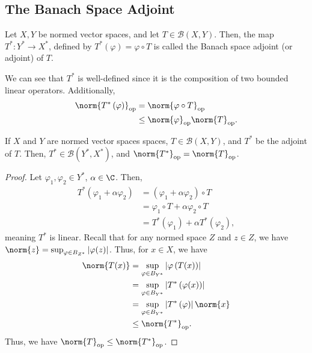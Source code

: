 \documentclass[10pt]{mypackage}
\begin{document}
\subsection{The Banach Space Adjoint}%
\begin{definition}
  Let $X,Y$ be normed vector spaces, and let $T\in \mathcal{B}\left(X,Y\right)$. Then, the map $T^{\ast}:Y^{\ast}\rightarrow X^{\ast}$, defined by $T^{\ast}\left(\varphi\right) = \varphi\circ T$ is called the Banach space adjoint (or adjoint) of $T$.
\end{definition}
We can see that $T^{\ast}$ is well-defined since it is the composition of two bounded linear operators. Additionally,
\begin{align*}
  \norm{T^{\ast}\left(\varphi\right)}_{\text{op}} &= \norm{\varphi\circ T}_{\text{op}}\\
                                                  &\leq \norm{\varphi}_{\text{op}}\norm{T}_{\text{op}}.
\end{align*}
\begin{proposition}
  If $X$ and $Y$ are normed vector spaces spaces, $T\in \mathcal{B}\left(X,Y\right)$, and $T^{\ast}$ be the adjoint of $T$. Then, $T^{\ast}\in \mathcal{B}\left(Y^{\ast},X^{\ast}\right)$, and $\norm{T^{\ast}}_{\text{op}} = \norm{T}_{\text{op}}$.
\end{proposition}
\begin{proof}
  Let $\varphi_1,\varphi_2\in Y^{\ast}$, $\alpha \in \C$. Then,
  \begin{align*}
    T^{\ast}\left(\varphi_1 + \alpha\varphi_2\right) &= \left(\varphi_1 + \alpha\varphi_2\right)\circ T\\
                                                     &= \varphi_1\circ T + \alpha\varphi_2\circ T\\
                                                     &= T^{\ast}\left(\varphi_1\right) + \alpha T^{\ast}\left(\varphi_2\right),
  \end{align*}
  meaning $T^{\ast}$ is linear. Recall that for any normed space $Z$ and $z\in Z$, we have $\norm{z} = \sup_{\varphi\in B_{Z^{\ast}}}\left\vert \varphi(z) \right\vert$. Thus, for $x\in X$, we have
  \begin{align*}
    \norm{T(x)} &= \sup_{\varphi\in B_{Y^{\ast}}}\left\vert \varphi\left(T(x)\right) \right\vert\\
                &= \sup_{\varphi\in B_{Y^{\ast}}}\left\vert T^{\ast}\left(\varphi(x)\right) \right\vert\\
                &= \sup_{\varphi\in B_{Y^{\ast}}}\left\vert T^{\ast}\left(\varphi\right) \right\vert\norm{x}\\
                &\leq \norm{T^{\ast}}_{\text{op}}.
  \end{align*}
  Thus, we have $\norm{T}_{\text{op}}\leq \norm{T^{\ast}}_{\text{op}}$.
\end{proof}
\end{document}
